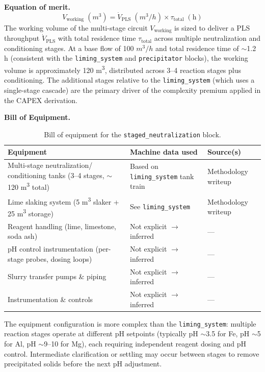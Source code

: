 \medskip
\noindent\textbf{Equation of merit.}\quad
\[
	V_\text{working}\;(\si{m^3}) = \dot{V}_\text{PLS}\;(\si{m^3/h}) \times \tau_\text{total}\;(\text{h})
\]
The working volume of the multi-stage circuit $V_\text{working}$ is sized to deliver a PLS throughput $\dot{V}_\text{PLS}$ with total residence time $\tau_\text{total}$ across multiple neutralization and conditioning stages. At a base flow of 100 $\si{m^3/h}$ and total residence time of $\sim$1.2 h (consistent with the \texttt{liming\_system} and \texttt{precipitator} blocks), the working volume is approximately 120 \si{m^3}, distributed across 3--4 reaction stages plus conditioning. The additional stages relative to the \texttt{liming\_system} (which uses a single-stage cascade) are the primary driver of the complexity premium applied in the CAPEX derivation.

\medskip
\noindent\textbf{Bill of Equipment.}\quad

\begin{table}[h!]
\caption{Bill of equipment for the \texttt{staged\_neutralization} block.}
\centering
\begin{tabular}{>{\raggedright\arraybackslash}p{6.0cm}
				>{\raggedright\arraybackslash}p{4.0cm}
				>{\raggedright\arraybackslash}p{4.5cm}}
\toprule
\textbf{Equipment} & \textbf{Machine data used} & \textbf{Source(s)} \\
\midrule
Multi-stage neutralization/ conditioning tanks (3--4 stages, $\sim$120 \si{m^3} total) & Based on \texttt{liming\_system} tank train & Methodology writeup \\
Lime slaking system (5 \si{m^3} slaker + 25 \si{m^3} storage) & See \texttt{liming\_system} & Methodology writeup \\
Reagent handling (lime, limestone, soda ash) & Not explicit $\rightarrow$ inferred & --- \\
pH control instrumentation (per-stage probes, dosing loops) & Not explicit $\rightarrow$ inferred & --- \\
Slurry transfer pumps \& piping & Not explicit $\rightarrow$ inferred & --- \\
Instrumentation \& controls & Not explicit $\rightarrow$ inferred & --- \\
\bottomrule
\end{tabular}
\end{table}

The equipment configuration is more complex than the \texttt{liming\_system}: multiple reaction stages operate at different pH setpoints (typically pH $\sim$3.5 for Fe, pH $\sim$5 for Al, pH $\sim$9--10 for Mg), each requiring independent reagent dosing and pH control. Intermediate clarification or settling may occur between stages to remove precipitated solids before the next pH adjustment.


